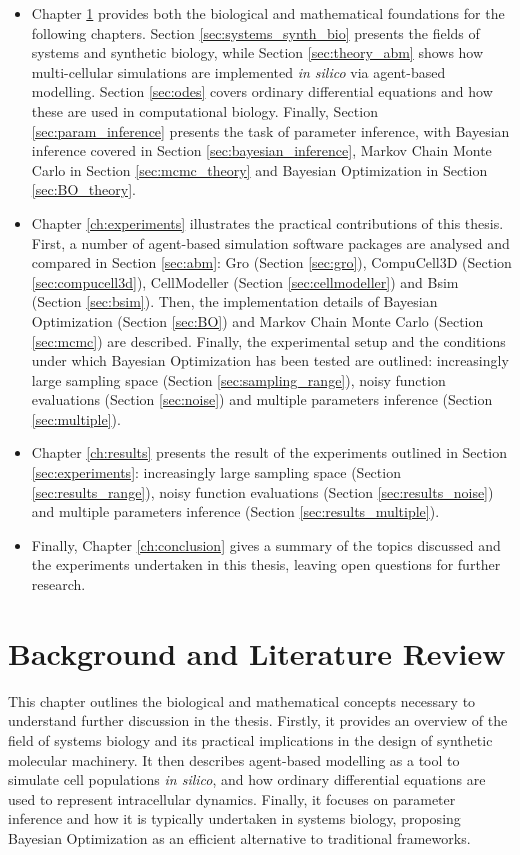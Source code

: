 \documentclass[bsc,frontabs,singlespacing,parskip,deptreport]{infthesis}
\begin{document}
\begin{itemize}
    \item Chapter \ref{ch:background} provides both the biological and mathematical foundations for the following chapters. Section \ref{sec:systems_synth_bio} presents the fields of systems and synthetic biology, while Section \ref{sec:theory_abm} shows how multi-cellular simulations are implemented \textit{in silico} via agent-based modelling. Section \ref{sec:odes} covers ordinary differential equations and how these are used in computational biology. Finally, Section \ref{sec:param_inference} presents the task of parameter inference, with Bayesian inference covered in Section \ref{sec:bayesian_inference}, Markov Chain Monte Carlo in Section \ref{sec:mcmc_theory} and Bayesian Optimization in Section \ref{sec:BO_theory}.
    
    \item Chapter \ref{ch:experiments} illustrates the practical contributions of this thesis. First, a number of agent-based simulation software packages are analysed and compared in Section \ref{sec:abm}: Gro (Section \ref{sec:gro}), CompuCell3D (Section \ref{sec:compucell3d}), CellModeller (Section \ref{sec:cellmodeller}) and Bsim (Section \ref{sec:bsim}). Then, the implementation details of Bayesian Optimization (Section \ref{sec:BO}) and Markov Chain Monte Carlo (Section \ref{sec:mcmc}) are described. Finally, the experimental setup and the conditions under which Bayesian Optimization has been tested are outlined: increasingly large sampling space (Section \ref{sec:sampling_range}), noisy function evaluations (Section \ref{sec:noise}) and multiple parameters inference (Section \ref{sec:multiple}).
    
    \item Chapter \ref{ch:results} presents the result of the experiments outlined in Section \ref{sec:experiments}: increasingly large sampling space (Section \ref{sec:results_range}), noisy function evaluations (Section \ref{sec:results_noise}) and multiple parameters inference (Section \ref{sec:results_multiple}).
    
    \item Finally, Chapter \ref{ch:conclusion} gives a summary of the topics discussed and the experiments undertaken in this thesis, leaving open questions for further research.
\end{itemize}

\chapter{Background and Literature Review}\label{ch:background}
This chapter outlines the biological and mathematical concepts necessary to understand further discussion in the thesis. Firstly, it provides an overview of the field of systems biology and its practical implications in the design of synthetic molecular machinery. It then describes agent-based modelling as a tool to simulate cell populations \textit{in silico}, and how ordinary differential equations are used to represent intracellular dynamics. Finally, it focuses on parameter inference and how it is typically undertaken in systems biology, proposing Bayesian Optimization as an efficient alternative to traditional frameworks. 
\end{document}
